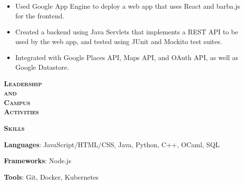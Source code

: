 \documentclass[12pt]{article}
\begin{document}
\begin{minipage}[t]{0.82\textwidth}
\begin{itemize}
    \begin{itemize}
      \item Used Google App Engine to deploy a web app that uses React and
        barba.js for the frontend.
      \item Created a backend using Java Servlets that implements a REST API
        to be used by the web app, and tested using JUnit and Mockito test
        suites.
      \item Integrated with Google Places API, Maps API, and OAuth API, as well
        as Google Datastore.
    \end{itemize}
  \end{itemize}
\end{minipage}

\vspace{0.75em}
{\color{Red} \hrulefill}

\begin{minipage}[t]{0.15\textwidth}\vspace{-0.5em}%
  {\color{Red} \textbf{\textsc{Leadership\\and\\Campus\\Activities}}}
\end{minipage}
\hfill
\begin{minipage}[t]{0.82\textwidth}\vspace{-0.5em}%
  \phantom{why is this needed to prevent warnings?}
\end{minipage}

\vspace{0.75em}
{\color{Red} \hrulefill}

\begin{minipage}[t]{0.15\textwidth}\vspace{-0.5em}%
  {\color{Red} \textbf{\textsc{Skills}}}
\end{minipage}
\hfill
\begin{minipage}[t]{0.82\textwidth}\vspace{-0.5em}%
  \textbf{Languages}: JavaScript/HTML/CSS, Java, Python, C++, OCaml,
      SQL

  \textbf{Frameworks}: Node.js
  
  \textbf{Tools}: Git, Docker, Kubernetes
\end{minipage}
\end{document}
